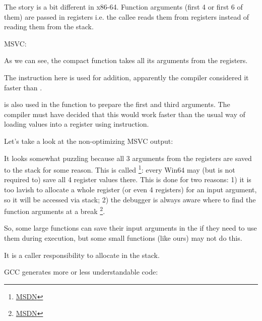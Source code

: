 

The story is a bit different in x86-64. Function arguments (first 4 or first 6 of them) 
are passed in registers i.e. the \gls{callee} reads them from registers instead of reading them from the stack.


\Optimizing MSVC:



As we can see, the compact function \ttf takes all its arguments from the registers.

The \LEA instruction here is used for addition,
apparently the compiler considered it faster than .

\LEA is also used in the \main function to prepare the first and third \ttf arguments. The compiler
must have decided that this would work faster than the usual way of loading values into a register using \MOV instruction.

Let's take a look at the non-optimizing MSVC output:



It looks somewhat puzzling because all 3 arguments from the registers are saved to the stack for some reason.
\label{shadow_space}
This is called 
\footnote{\href{http://go.yurichev.com/17256}{MSDN}}: 
every Win64 may (but is not required to) save all 4 register values there.
This is done for two reasons: 
1) it is too lavish to allocate a whole register (or even 4 registers) for an input argument,
so it will be accessed via stack;
2) the debugger is always aware where to find the function arguments at a break
\footnote{\href{http://go.yurichev.com/17257}{MSDN}}.

So, some large functions can save their input arguments in the  if they need to use them
during execution, but some small functions (like ours) may not do this.

It is a \gls{caller} responsibility to allocate  in the stack.


\Optimizing GCC generates more or less understandable code:



